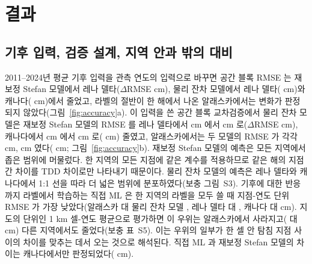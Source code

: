 \section{결과}\label{sec:results}

\subsection{기후 입력, 검증 설계, 지역 안과 밖의 대비}
2011--2024년 평균 기후 입력을 관측 연도의 입력으로 바꾸면 공간 블록 RMSE 는 재보정 Stefan 모델에서 레나 델타($\Delta$RMSE \ndforcLePo{} cm), 물리 잔차 모델에서 레나 델타(\ndforcLeRo{} cm)와 캐나다(\ndforcCaRo{} cm)에서 줄었고, 라벨의 절반이 한 해에서 나온 알래스카에서는 변화가 판정되지 않았다(그림~\ref{fig:accuracy}a). 이 입력을 쓴 공간 블록 교차검증에서 물리 잔차 모델은 재보정 Stefan 모델의 RMSE 를 레나 델타에서 \nrmseLeblkPo{} cm 에서 \nrmseLeblkRo{} cm 로($\Delta$RMSE \ndrefLeblkRo{} cm), 캐나다에서 \nrmseCablkPo{} cm 에서 \nrmseCablkRo{} cm 로(\ndrefCablkRo{} cm) 줄였고, 알래스카에서는 두 모델의 RMSE 가 각각 \nrmseAkblkPo{} cm, \nrmseAkblkRo{} cm 였다(\ndrefAkblkRo{} cm; 그림~\ref{fig:accuracy}b). 재보정 Stefan 모델의 예측은 모든 지역에서 좁은 범위에 머물렀다. 한 지역의 모든 지점에 같은 계수를 적용하므로 같은 해의 지점 간 차이를 TDD 차이로만 나타내기 때문이다. 물리 잔차 모델의 예측은 레나 델타와 캐나다에서 1:1 선을 따라 더 넓은 범위에 분포하였다(보충 그림~S3). 기후에 대한 반응까지 라벨에서 학습하는 직접 ML 은 한 지역의 라벨을 모두 쓸 때 지점-연도 단위 RMSE 가 가장 낮았다(알래스카 \nrmseAkblkDz{} 대 물리 잔차 모델 \nrmseAkblkRo, 레나 델타 \nrmseLeblkDz{} 대 \nrmseLeblkRo, 캐나다 \nrmseCablkDz{} 대 \nrmseCablkRo{} cm). 지도의 단위인 1 km 셀-연도 평균으로 평가하면 이 우위는 알래스카에서 사라지고(\ncyAkblkDz{} 대 \ncyAkblkRo{} cm) 다른 지역에서도 줄었다(보충 표~S5). 이는 우위의 일부가 한 셀 안 탐침 지점 사이의 차이를 맞추는 데서 오는 것으로 해석된다. 직접 ML 과 재보정 Stefan 모델의 차이는 캐나다에서만 판정되었다(\ndrefCablkDz{} cm).


